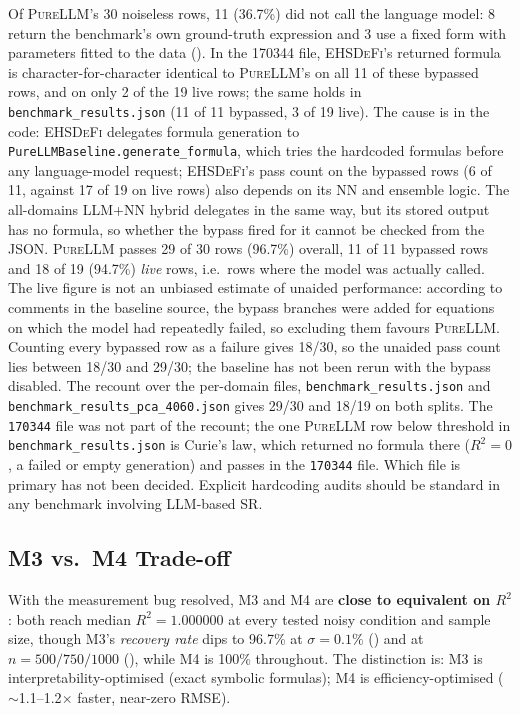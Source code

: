 \documentclass[twoside,11pt]{article}
\newcommand{\PureLLM}{\textsc{PureLLM}}
\newcommand{\EHD}{\textsc{EHSDeFi}}
\newcommand{\Rsq}{R^{2}}
\begin{document}
Of \PureLLM{}'s 30 noiseless rows, 11 (36.7\%) did not call the language model: 8 return the benchmark's own
ground-truth expression and 3 use a fixed form with parameters fitted to the data
(). In the 170344 file, \EHD{}'s returned formula is character-for-character identical to \PureLLM{}'s on all 11 of these bypassed rows, and on only 2 of the 19 live rows; the same holds in \texttt{benchmark\_results.json} (11 of 11 bypassed, 3 of 19 live). The cause is in the code: \EHD{} delegates formula generation to \texttt{PureLLMBaseline.generate\_formula}, which tries the hardcoded formulas before any language-model request; \EHD{}'s pass count on the bypassed rows (6 of 11, against 17 of 19 on live rows) also depends on its NN and ensemble logic. The all-domains LLM+NN hybrid delegates in the same way, but its stored output has no formula, so whether the bypass fired for it cannot be checked from the JSON. \PureLLM{} passes 29 of 30 rows (96.7\%) overall, 11 of 11 bypassed rows and 18 of 19
(94.7\%) \emph{live} rows, i.e.\ rows where the model was actually called. The live figure is not an unbiased
estimate of unaided performance: according to comments in the baseline source, the bypass branches were added for
equations on which the model had repeatedly failed, so excluding them favours \PureLLM{}. Counting every bypassed
row as a failure gives 18/30, so the unaided pass count lies between 18/30 and 29/30; the baseline has not been rerun
with the bypass disabled.
The recount over the per-domain files, \texttt{benchmark\_results.json} and \texttt{benchmark\_results\_pca\_4060.json} gives 29/30 and 18/19 on both splits. The \texttt{170344} file was not part of the recount; the one \PureLLM{} row below threshold in \texttt{benchmark\_results.json} is Curie's law, which returned no formula there ($\Rsq=0$, a failed or empty generation) and passes in the \texttt{170344} file. Which file is primary has not been decided.
Explicit hardcoding audits should be standard in any
benchmark involving LLM-based SR.

\subsection{M3 vs.\ M4 Trade-off}

With the measurement bug resolved, M3 and M4 are \textbf{close to
equivalent on $\Rsq$}: both reach median $\Rsq = 1.000000$ at every
tested noisy condition and sample size, though M3's \emph{recovery
rate} dips to 96.7\% at $\sigma=0.1\%$ () and at
$n=500/750/1000$ (), while M4 is 100\% throughout.
The distinction is: M3 is interpretability-optimised (exact symbolic
formulas); M4 is efficiency-optimised ($\sim$1.1--1.2$\times$ faster,
near-zero RMSE).
\end{document}
